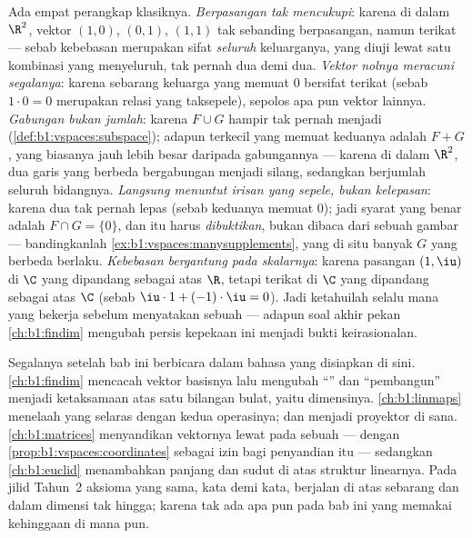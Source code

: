 \begin{remark}
\label{rem:b1:vspaces:pitfalls}
Ada empat perangkap klasiknya.
\emph{Berpasangan tak mencukupi}: karena di dalam $\R^2$, vektor $(1,0)$,
$(0,1)$, $(1,1)$ tak sebanding berpasangan, namun terikat ---
sebab kebebasan merupakan sifat \emph{seluruh} keluarganya, yang diuji lewat satu
kombinasi yang menyeluruh, tak pernah dua demi dua.
\emph{Vektor nolnya meracuni segalanya}: karena sebarang keluarga yang memuat
$0$ bersifat terikat (sebab $1\cdot 0 = 0$ merupakan relasi yang taksepele), sepolos
apa pun vektor lainnya.
\emph{Gabungan bukan jumlah}: karena $F \cup G$ hampir tak pernah menjadi 
(\cref{def:b1:vspaces:subspace}); adapun  terkecil
yang memuat keduanya adalah $F + G$, yang biasanya jauh lebih besar daripada gabungannya
--- karena di dalam $\R^2$, dua garis yang berbeda bergabungan menjadi silang, sedangkan berjumlah
seluruh bidangnya.
\emph{Langsung menuntut irisan yang sepele, bukan kelepasan}:
karena dua  tak pernah lepas (sebab keduanya memuat $0$); jadi syarat
yang benar adalah $F \cap G = \{0\}$, dan itu harus \emph{dibuktikan},
bukan dibaca dari sebuah gambar --- bandingkanlah
\cref{ex:b1:vspaces:manysupplements}, yang di situ banyak $G$ yang berbeda
berlaku.
\emph{Kebebasan bergantung pada skalarnya}: karena pasangan $(1, \iu)$
 di $\C$ yang dipandang sebagai  atas $\R$, tetapi terikat di $\C$
yang dipandang sebagai  atas $\C$ (sebab $\iu\cdot 1 + (-1)\cdot\iu = 0$).
Jadi ketahuilah selalu  mana yang bekerja sebelum menyatakan sebuah 
--- adapun soal akhir pekan \cref{ch:b1:findim} mengubah persis
kepekaan ini menjadi bukti keirasionalan.
\end{remark}

\begin{remark}
\label{rem:b1:vspaces:whereused}
Segalanya setelah bab ini berbicara dalam bahasa yang disiapkan di sini.
\cref{ch:b1:findim} mencacah vektor basisnya lalu mengubah ``'' dan
``pembangun'' menjadi ketaksamaan atas satu bilangan bulat, yaitu
dimensinya. \cref{ch:b1:linmaps} menelaah  yang selaras dengan
kedua operasinya; dan  menjadi proyektor di sana.
\cref{ch:b1:matrices} menyandikan vektornya lewat  pada sebuah
 --- dengan \cref{prop:b1:vspaces:coordinates} sebagai izin bagi
penyandian itu --- sedangkan \cref{ch:b1:euclid} menambahkan panjang dan sudut
di atas struktur linearnya. Pada jilid Tahun~2 aksioma yang
sama, kata demi kata, berjalan di atas  sebarang dan dalam dimensi
tak hingga; karena tak ada apa pun pada bab ini yang memakai kehinggaan di mana pun.
\end{remark}

